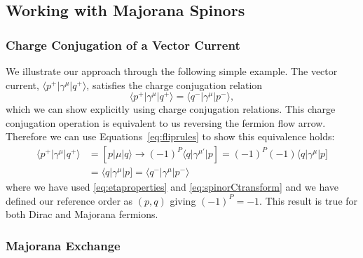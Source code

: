 \documentclass[preprint,number,12pt,sort&compress]{elsarticle}
\newcommand{\bra}[1]{\langle #1 \vert}
\newcommand{\brb}[1]{[ #1 \vert}
\newcommand{\kea}[1]{\vert #1 \rangle}
\newcommand{\keb}[1]{\vert #1 ]}
\begin{document}
\subsection{Working with Majorana Spinors}
\subsubsection{Charge Conjugation of a Vector Current}
We illustrate our approach through the following simple example.
The vector current, $\langle p^{+} | \gamma^{\mu} | q^{+} \rangle$, satisfies the charge conjugation relation
\begin{equation}
\langle p^{+} | \gamma^{\mu} | q^{+} \rangle = 
\langle q^{-} | \gamma^{\mu} | p^{-} \rangle,
\end{equation}
which we can show explicitly using charge conjugation relations.
This charge conjugation operation is equivalent to us
reversing the fermion flow arrow. Therefore we can use Equations~\eqref{eq:fliprules} to show this equivalence
holds:
\begin{align}
\langle p^{+} | \gamma^{\mu} | q^{+} \rangle 
&= \brb{p} \mu \kea{q} \rightarrow (-1)^{P} \bra{q} \gamma^{\mu'} \keb{p} = (-1)^{P} (-1) \bra{q} \gamma^{\mu} \keb{p} \\
& = \bra{q} \gamma^{\mu} \keb{p} = \langle q^{-} | \gamma^{\mu} | p^{-} \rangle
\end{align}
where we have used \eqref{eq:etaproperties} and \eqref{eq:spinorCtransform} and we have defined our reference order 
as $(p,q)$ giving $(-1)^{P} = -1$.
This result is true for both Dirac and Majorana fermions.



\subsubsection{Majorana Exchange}
\end{document}
